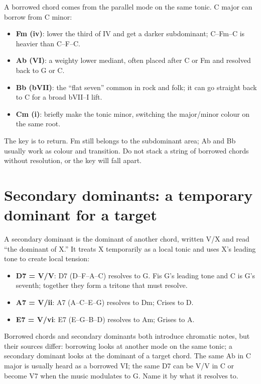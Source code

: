 A borrowed chord comes from the parallel mode on the same tonic. C major can borrow from C minor:

\begin{itemize}
  \item \textbf{Fm (iv)}: lower the third of IV and get a darker subdominant; C--Fm--C is heavier than C--F--C.
  \item \textbf{Ab (VI)}: a weighty lower mediant, often placed after C or Fm and resolved back to G or C.
  \item \textbf{Bb (bVII)}: the ``flat seven'' common in rock and folk; it can go straight back to C for a broad bVII--I lift.
  \item \textbf{Cm (i)}: briefly make the tonic minor, switching the major/minor colour on the same root.
\end{itemize}

The key is to return. Fm still belongs to the subdominant area; Ab and Bb usually work as colour and transition. Do not stack a string of borrowed chords without resolution, or the key will fall apart.

\section{Secondary dominants: a temporary dominant for a target}

A secondary dominant is the dominant of another chord, written V/X and read ``the dominant of X.'' It treats X temporarily as a local tonic and uses X's leading tone to create local tension:

\begin{itemize}
  \item \textbf{D7 = V/V}: D7 (D--F\sharpsym--A--C) resolves to G. F\sharpsym is G's leading tone and C is G's seventh; together they form a tritone that must resolve.
  \item \textbf{A7 = V/ii}: A7 (A--C\sharpsym--E--G) resolves to Dm; C\sharpsym rises to D.
  \item \textbf{E7 = V/vi}: E7 (E--G\sharpsym--B--D) resolves to Am; G\sharpsym rises to A.
\end{itemize}

Borrowed chords and secondary dominants both introduce chromatic notes, but their sources differ: borrowing looks at another mode on the same tonic; a secondary dominant looks at the dominant of a target chord. The same Ab in C major is usually heard as a borrowed VI; the same D7 can be V/V in C or become V7 when the music modulates to G. Name it by what it resolves to.


